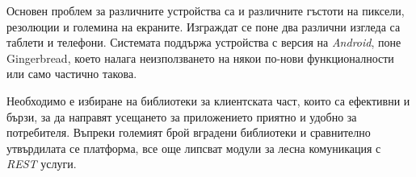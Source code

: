 	Основен проблем за различните устройства са и различните гъстоти на пиксели, резолюции и големина на екраните. Изграждат се поне два различни изгледа са таблети и телефони. Системата поддържа устройства с версия на \emph{Android}, поне Gingerbread, което налага неизползването на някои по-нови функционалности или само частично такова.
	
	Необходимо е избиране на библиотеки за клиентската част, които са ефективни и бързи, за да направят усещането за приложението приятно и удобно за потребителя. Въпреки големият брой вградени библиотеки и сравнително утвърдилата се платформа, все още липсват модули за лесна комуникация с \emph{REST} услуги.